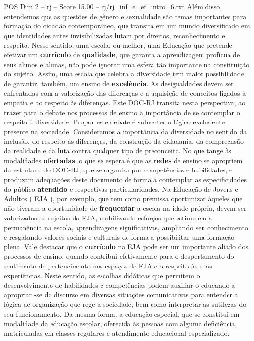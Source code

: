 \begin{textsample}{POS Dim 2 – rj – Score 15.00 – rj/rj\_inf\_e\_ef\_intro\_6.txt}
Além disso, entendemos que as questões de gênero e sexualidade são temas importantes para formação do cidadão contemporâneo, que transita em um mundo diversificado em que identidades antes invisibilizadas lutam por direitos, reconhecimento e respeito.
Nesse sentido, uma escola, ou melhor, uma Educação que pretende efetivar um \textbf{currículo} de \textbf{qualidade}, que garanta a aprendizagem profícua de seus alunos e alunas, não pode ignorar uma esfera tão importante na constituição do sujeito.
Assim, uma escola que celebra a diversidade tem maior possibilidade de garantir, também, um ensino de \textbf{excelência}.
As desigualdades devem ser enfrentadas com a valorização das diferenças e a aquisição de conceitos ligados à empatia e ao respeito às diferenças.
Este DOC-RJ transita nesta perspectiva, ao trazer para o debate nos processos de ensino a importância de se contemplar o respeito à diversidade.
Propor este debate é subverter o lógico excludente presente na sociedade.
Consideramos a importância da diversidade no sentido da inclusão, do respeito às diferenças, da construção da cidadania, da compreensão da realidade e da luta contra qualquer tipo de preconceito.
No que tange às modalidades \textbf{ofertadas}, o que se espera é que as \textbf{redes} de ensino se apropriem da estrutura do DOC-RJ, que se organiza por competências e habilidades, e produzam adequações deste documento de forma a contemplar as especificidades do público \textbf{atendido} e respectivas particularidades.
Na Educação de Jovens e Adultos ( EJA ), por exemplo, que tem como premissa oportunizar àqueles que não tiveram a oportunidade de \textbf{frequentar} a escola na idade própria, devem ser valorizados os sujeitos da EJA, mobilizando esforços que estimulem a permanência na escola, aprendizagens significativas, ampliando seu conhecimento e resgatando valores sociais e culturais de forma a possibilitar uma formação plena.
Vale destacar que o \textbf{currículo} na EJA pode ser um importante aliado dos processos de ensino, quando contribui efetivamente para o despertamento do sentimento de pertencimento nos espaços de EJA e o respeito às suas experiências.
Neste sentido, as escolhas didáticas que permitem o desenvolvimento de habilidades e competências podem auxiliar o educando a apropriar -se do discurso em diversas situações comunicativas para entender a lógica de organização que rege a sociedade, bem como interpretar as sutilezas do seu funcionamento.
Da mesma forma, a educação especial, que se constitui em modalidade da educação escolar, oferecida às pessoas com alguma deficiência, matriculadas em classes regulares e atendimento educacional especializado.

\end{textsample}
